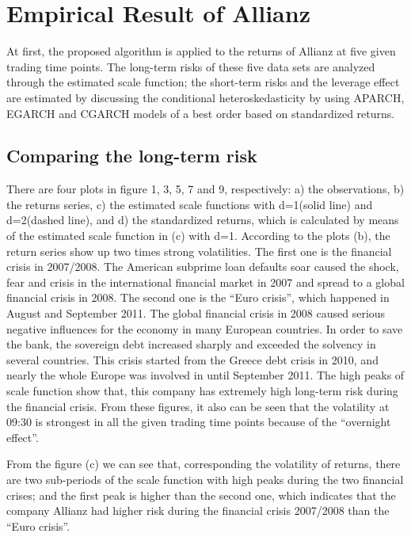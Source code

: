 \section{Empirical Result of Allianz}

At first, the proposed algorithm is applied to the returns of Allianz at five given trading time points. The long-term risks of these five data sets are analyzed through the estimated scale function; the short-term risks and the leverage effect are estimated by discussing the conditional heteroskedasticity by using APARCH, EGARCH and CGARCH models of a best order based on standardized returns. 


\subsection{Comparing the long-term risk}

There are four plots in figure 1, 3, 5, 7 and 9, respectively: a) the observations, b) the returns series, c) the estimated scale functions with d=1(solid line) and d=2(dashed line), and d) the standardized returns, which is calculated by means of the estimated scale function in (c) with d=1. 
According to the plots (b), the return series show up two times strong volatilities. The first one is the financial crisis in 2007/2008. The American subprime loan defaults soar caused the shock, fear and crisis in the international financial market in 2007 and spread to a global financial crisis in 2008. The second one is the ``Euro crisis'', which happened in August and September 2011. The global financial crisis in 2008 caused serious negative influences for the economy in many European countries. In order to save the bank, the sovereign debt increased sharply and exceeded the solvency in several countries. This crisis started from the Greece debt crisis in 2010, and nearly the whole Europe was involved in until September 2011. The high peaks of scale function show that, this company has extremely high long-term risk during the financial crisis. From these figures, it also can be seen that the volatility at 09:30 is strongest in all the given trading time points because of the ``overnight effect''. 

From the figure (c) we can see that, corresponding the volatility of returns, there are two sub-periods of the scale function with high peaks during the two financial crises; and the first peak is higher than the second one, which indicates that the company Allianz had higher risk during the financial crisis 2007/2008 than the ``Euro crisis''.

